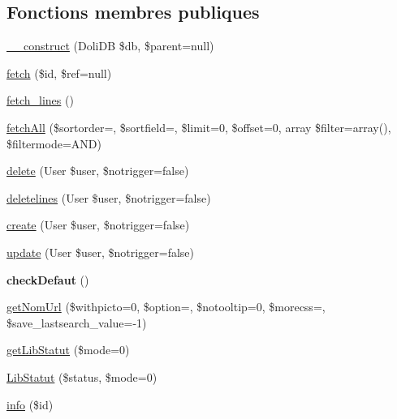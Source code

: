 \subsection*{Fonctions membres publiques}
\begin{DoxyCompactItemize}
\item 
\hyperlink{classTourneeObject_ab9d8bb7b8b6e5ddbdad0686ec58f2cff}{\+\_\+\+\_\+construct} (Doli\+DB \$db, \$parent=null)
\item 
\hyperlink{classTourneeObject_a7e7abdc1526aff2aa479a69d556c2e33}{fetch} (\$id, \$ref=null)
\item 
\hyperlink{classTourneeObject_af36a3b3e99489f3476c2a7833f98fc99}{fetch\+\_\+lines} ()
\item 
\hyperlink{classTourneeObject_a6a9976287b0875d6557c6cc9d4ae68f6}{fetch\+All} (\$sortorder=\textquotesingle{}\textquotesingle{}, \$sortfield=\textquotesingle{}\textquotesingle{}, \$limit=0, \$offset=0, array \$filter=array(), \$filtermode=\textquotesingle{}A\+ND\textquotesingle{})
\item 
\hyperlink{classTourneeObject_a8d652020470deae2373d86509dcc86ea}{delete} (User \$user, \$notrigger=false)
\item 
\hyperlink{classTourneeObject_a46c3bb645f096ebf1668a76f7fea0595}{deletelines} (User \$user, \$notrigger=false)
\item 
\hyperlink{classTourneeObject_a9b71233f3654dbf3ed935ecbef106e4a}{create} (User \$user, \$notrigger=false)
\item 
\hyperlink{classTourneeObject_a3391a48883a2ff7f6862d1f0195beaf7}{update} (User \$user, \$notrigger=false)
\item 
\mbox{\label{classTourneeObject_aacb648b3fd86a4978e06caa92fcebeb5}} 
{\bfseries check\+Defaut} ()
\item 
\hyperlink{classTourneeObject_a92abf5c0eb6c1c07aa18e1d9923cb808}{get\+Nom\+Url} (\$withpicto=0, \$option=\textquotesingle{}\textquotesingle{}, \$notooltip=0, \$morecss=\textquotesingle{}\textquotesingle{}, \$save\+\_\+lastsearch\+\_\+value=-\/1)
\item 
\hyperlink{classTourneeObject_a15de2c8fefd05e6d54d50e7508538216}{get\+Lib\+Statut} (\$mode=0)
\item 
\hyperlink{classTourneeObject_a7c0fc621023d578afd8e5c6ee785fd19}{Lib\+Statut} (\$status, \$mode=0)
\item 
\hyperlink{classTourneeObject_a846f4cdedd2f2f6353d55470740f55c3}{info} (\$id)
\item 

\end{DoxyCompactItemize}
